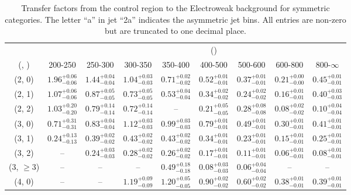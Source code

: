 \begin{table}[h!]
\tiny
\centering
\caption{Transfer factors from the \mj control region to the Electroweak background for symmetric categories. The letter ``a'' in jet \eg ``2a''  indicates the asymmetric jet bins. All entries are non-zero but are truncated to one decimal place.\label{tab:tf_mu_total_sym}}
\begin{tabular}
{ccccccccc}
	\hline\hline
&	& \multicolumn{8}{c}{\scalht (\gev)} \\ 
	 (\njet,  \nb) & 200-250 & 250-300 & 300-350 & 350-400 & 400-500 & 500-600 & 600-800 & 800-$\infty$ \\ [0.8ex] 
\hline
	(2, 0) & $1.96^{+ 0.06 }_{- 0.06 }$ & $1.44^{+ 0.04 }_{- 0.04 }$ & $1.04^{+ 0.03 }_{- 0.03 }$ & $0.71^{+ 0.02 }_{- 0.02 }$ & $0.52^{+ 0.01 }_{- 0.01 }$ & $0.37^{+ 0.01 }_{- 0.01 }$ & $0.21^{+ 0.00 }_{- 0.00 }$ & $0.45^{+ 0.01 }_{- 0.01 }$ \\[0.5ex] 
	(2, 1) & $1.07^{+ 0.06 }_{- 0.06 }$ & $0.87^{+ 0.05 }_{- 0.05 }$ & $0.73^{+ 0.05 }_{- 0.05 }$ & $0.53^{+ 0.04 }_{- 0.04 }$ & $0.34^{+ 0.02 }_{- 0.02 }$ & $0.24^{+ 0.02 }_{- 0.02 }$ & $0.16^{+ 0.01 }_{- 0.01 }$ & $0.40^{+ 0.03 }_{- 0.03 }$ \\[0.5ex] 
	(2, 2) & $1.03^{+ 0.20 }_{- 0.20 }$ & $0.79^{+ 0.14 }_{- 0.14 }$ & $0.72^{+ 0.14 }_{- 0.14 }$ & -- & $0.21^{+ 0.05 }_{- 0.05 }$ & $0.28^{+ 0.08 }_{- 0.08 }$ & $0.08^{+ 0.02 }_{- 0.02 }$ & $0.10^{+ 0.04 }_{- 0.04 }$ \\[0.5ex] 
	(3, 0) & $0.71^{+ 0.31 }_{- 0.31 }$ & $0.83^{+ 0.04 }_{- 0.04 }$ & $1.12^{+ 0.03 }_{- 0.03 }$ & $0.99^{+ 0.03 }_{- 0.03 }$ & $0.79^{+ 0.01 }_{- 0.01 }$ & $0.49^{+ 0.01 }_{- 0.01 }$ & $0.30^{+ 0.01 }_{- 0.01 }$ & $0.41^{+ 0.01 }_{- 0.01 }$ \\[0.5ex] 
	(3, 1) & $0.24^{+ 0.13 }_{- 0.13 }$ & $0.39^{+ 0.02 }_{- 0.02 }$ & $0.43^{+ 0.02 }_{- 0.02 }$ & $0.43^{+ 0.02 }_{- 0.02 }$ & $0.34^{+ 0.01 }_{- 0.01 }$ & $0.23^{+ 0.01 }_{- 0.01 }$ & $0.15^{+ 0.01 }_{- 0.01 }$ & $0.25^{+ 0.01 }_{- 0.01 }$ \\[0.5ex] 
	(3, 2) & -- & $0.24^{+ 0.03 }_{- 0.03 }$ & $0.28^{+ 0.02 }_{- 0.02 }$ & $0.26^{+ 0.02 }_{- 0.02 }$ & $0.17^{+ 0.01 }_{- 0.01 }$ & $0.11^{+ 0.01 }_{- 0.01 }$ & $0.06^{+ 0.01 }_{- 0.01 }$ & $0.08^{+ 0.01 }_{- 0.01 }$ \\[0.5ex] 
	(3, $\ge3$) & -- & -- & -- & $0.49^{+ 0.18 }_{- 0.18 }$ & $0.08^{+ 0.03 }_{- 0.03 }$ & $0.06^{+ 0.04 }_{- 0.04 }$ & -- & -- \\[0.5ex] 
	(4, 0) & -- & -- & $1.19^{+ 0.09 }_{- 0.09 }$ & $1.20^{+ 0.05 }_{- 0.05 }$ & $0.90^{+ 0.02 }_{- 0.02 }$ & $0.60^{+ 0.02 }_{- 0.02 }$ & $0.38^{+ 0.01 }_{- 0.01 }$ & $0.39^{+ 0.01 }_{- 0.01 }$ \\[0.5ex] 

\end{tabular}
\end{table}
